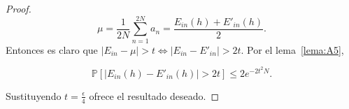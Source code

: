 \begin{lema}
\begin{proof}
         \begin{displaymath}
             \mu = \frac{1}{2N} \sum_{n=1}^{2N} a_n = \frac{E_{in}(h) + E'_{in}(h)}{2}.
         \end{displaymath}
         Entonces es claro que $| E_{in} - \mu | > t \Leftrightarrow | E_{in} - E'_{in} | > 2t$.
         Por el lema~\ref{lema:A5},

         \begin{displaymath}
             \mathbb{P} \left[| E_{in}(h) - E'_{in}(h) | > 2t \right] \leq 2e^{-2t^2 N}.
         \end{displaymath}

         Sustituyendo $t = \frac{\epsilon}{4}$ ofrece el resultado deseado.

   \end{proof}
\end{lema}
